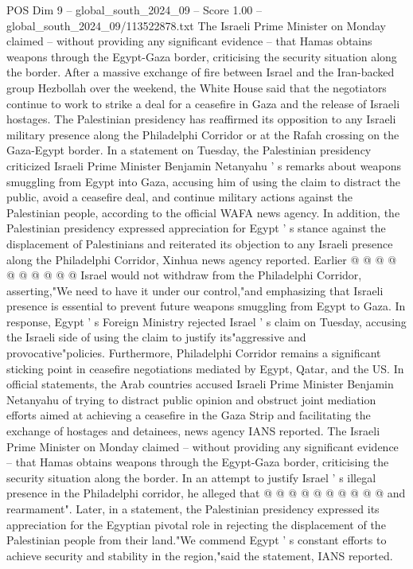 \begin{textsample}{POS Dim 9 – global\_south\_2024\_09 – Score 1.00 – global\_south\_2024\_09/113522878.txt}  \label{ex:f9_pos_340}
The Israeli Prime Minister on Monday claimed -- without providing any significant evidence -- that Hamas obtains weapons through the Egypt-Gaza border, criticising the security situation along the border.
After a massive exchange of fire between Israel and the Iran-backed group Hezbollah over the weekend, the White House said that the negotiators continue to work to strike a deal for a ceasefire in Gaza and the release of Israeli hostages.
The Palestinian presidency has reaffirmed its opposition to any Israeli military presence along the Philadelphi Corridor or at the Rafah crossing on the Gaza-Egypt border.
In a statement on Tuesday, the Palestinian presidency criticized Israeli Prime Minister Benjamin Netanyahu ' s remarks about weapons smuggling from Egypt into Gaza, accusing him of using the claim to distract the public, avoid a ceasefire deal, and continue military actions against the Palestinian people, according to the official WAFA news agency.
In addition, the Palestinian presidency expressed appreciation for Egypt ' s stance against the displacement of Palestinians and reiterated its objection to any Israeli presence along the Philadelphi Corridor, Xinhua news agency reported.
Earlier @ @ @ @ @ @ @ @ @ @ Israel would not withdraw from the Philadelphi Corridor, asserting,"We need to have it under our control,"and emphasizing that Israeli presence is essential to prevent future weapons smuggling from Egypt to Gaza.
In response, Egypt ' s Foreign Ministry rejected Israel ' s claim on Tuesday, accusing the Israeli side of using the claim to justify its"aggressive and provocative"policies.
Furthermore, Philadelphi Corridor remains a significant sticking point in ceasefire negotiations mediated by Egypt, Qatar, and the US.
In official statements, the Arab countries accused Israeli Prime Minister Benjamin Netanyahu of trying to distract public opinion and obstruct joint mediation efforts aimed at achieving a ceasefire in the Gaza Strip and facilitating the exchange of hostages and detainees, news agency IANS reported.
The Israeli Prime Minister on Monday claimed -- without providing any significant evidence -- that Hamas obtains weapons through the Egypt-Gaza border, criticising the security situation along the border.
In an attempt to justify Israel ' s illegal presence in the Philadelphi corridor, he alleged that @ @ @ @ @ @ @ @ @ @ and rearmament".
Later, in a statement, the Palestinian presidency expressed its appreciation for the Egyptian pivotal role in rejecting the displacement of the Palestinian people from their land."We commend Egypt ' s constant efforts to achieve security and stability in the region,"said the statement, IANS reported.

\end{textsample}

